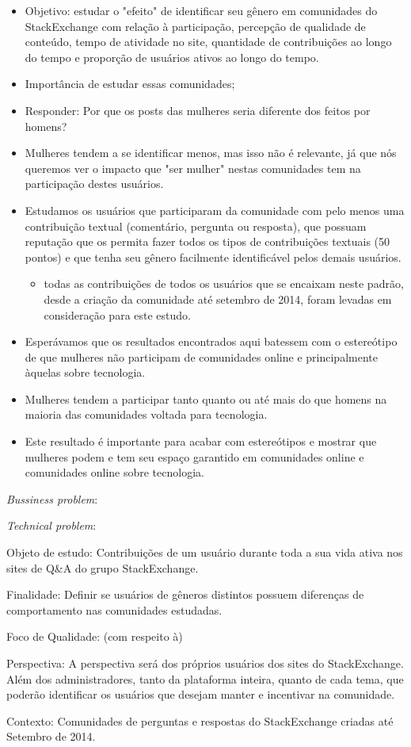 \begin{itemize}
	\item Objetivo: estudar o "efeito" de identificar seu gênero em comunidades do StackExchange com relação à participação, percepção de qualidade de conteúdo, tempo de atividade no site, quantidade de contribuições ao longo do tempo e proporção de usuários ativos ao longo do tempo.
	\item Importância de estudar essas comunidades;
	\item Responder: Por que os posts das mulheres seria diferente dos feitos por homens?
	\item Mulheres tendem a se identificar menos, mas isso não é relevante, já que nós queremos ver o impacto que "ser mulher" nestas comunidades tem na participação destes usuários.
	\item Estudamos os usuários que participaram da comunidade com pelo menos uma contribuição textual (comentário, pergunta ou resposta), que possuam reputação que os permita fazer todos os tipos de contribuições textuais (50 pontos) e que tenha seu gênero facilmente identificável pelos demais usuários.
	\begin{itemize}
		\item todas as contribuições de todos os usuários que se encaixam neste padrão, desde a criação da comunidade até setembro de 2014, foram levadas em consideração para este estudo.
	\end{itemize}
	\item Esperávamos que os resultados encontrados aqui batessem com o estereótipo de que mulheres não participam de comunidades online e principalmente àquelas sobre tecnologia.
	\item Mulheres tendem a participar tanto quanto ou até mais do que homens na maioria das comunidades voltada para tecnologia. 
	\item Este resultado é importante para acabar com estereótipos e mostrar que mulheres podem e tem seu espaço garantido em comunidades online e comunidades online sobre tecnologia.
\end{itemize}

\emph{Bussiness problem}: 

\emph{Technical problem}: 

Objeto de estudo: Contribuições de um usuário durante toda a sua vida ativa nos sites de Q\&A do grupo StackExchange.

Finalidade: Definir se usuários de gêneros distintos possuem diferenças de comportamento nas comunidades estudadas.

Foco de Qualidade: (com respeito à)

Perspectiva: A perspectiva será dos próprios usuários dos sites do StackExchange. Além dos administradores, tanto da plataforma inteira, quanto de cada tema, que poderão identificar os usuários que desejam manter e incentivar na comunidade.

Contexto: Comunidades de perguntas e respostas do StackExchange criadas até Setembro de 2014.